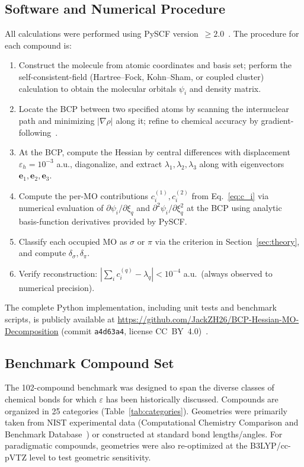 \documentclass[11pt,a4paper]{article}
\newcommand{\delsg}{\delta_{\sigma}}
\newcommand{\delpi}{\delta_{\pi}}
\newcommand{\eps}{\varepsilon}
\begin{document}
\subsection{Software and Numerical Procedure}

All calculations were performed using PySCF version~$\ge 2.0$~\citep{Sun2018,Sun2020}.
The procedure for each compound is:

\begin{enumerate}
\item Construct the molecule from atomic coordinates and basis set; perform the
self-consistent-field (Hartree--Fock, Kohn--Sham, or coupled cluster) calculation
to obtain the molecular orbitals $\psi_i$ and density matrix.
\item Locate the BCP between two specified atoms by scanning the
internuclear path and minimizing $|\nabla \rho|$ along it; refine
to chemical accuracy by gradient-following~\citep{Bader1990}.
\item At the BCP, compute the Hessian by central differences with
displacement $\eps_h = 10^{-3}$ a.u., diagonalize, and extract
$\lambda_1, \lambda_2, \lambda_3$ along with eigenvectors
$\mathbf{e}_1, \mathbf{e}_2, \mathbf{e}_3$.
\item Compute the per-MO contributions
$c_i^{(1)}, c_i^{(2)}$ from Eq.~\ref{eq:c_i} via numerical
evaluation of $\partial \psi_i/\partial \xi_q$ and
$\partial^2 \psi_i/\partial \xi_q^2$ at the BCP using
analytic basis-function derivatives provided by PySCF.
\item Classify each occupied MO as $\sigma$ or $\pi$ via the
criterion in Section~\ref{sec:theory}, and compute $\delsg, \delpi$.
\item Verify reconstruction:
$|\sum_i c_i^{(q)} - \lambda_q| < 10^{-4}$ a.u.\ (always observed
to numerical precision).
\end{enumerate}

The complete Python implementation, including unit tests and
benchmark scripts, is publicly available at
\url{https://github.com/JackZH26/BCP-Hessian-MO-Decomposition}
(commit \texttt{a4d63a4}, license CC~BY~4.0)~\citep{Zhou2026code}.

\subsection{Benchmark Compound Set}

The 102-compound benchmark was designed to span the diverse classes
of chemical bonds for which $\eps$ has been historically discussed.
Compounds are organized in 25 categories
(Table~\ref{tab:categories}). Geometries were primarily taken from
NIST experimental data (Computational Chemistry Comparison and
Benchmark Database~\citep{NISTCCCBDB}) or constructed at standard
bond lengths/angles. For paradigmatic compounds, geometries were
also re-optimized at the B3LYP/cc-pVTZ level to test geometric
sensitivity.
\end{document}
